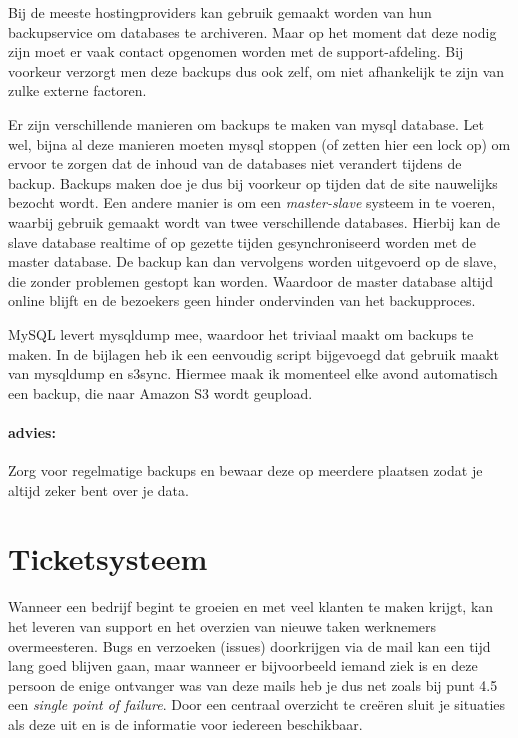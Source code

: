 Bij de meeste hostingproviders kan gebruik gemaakt worden van hun backupservice om databases te archiveren. Maar op het moment dat deze nodig zijn moet er vaak contact opgenomen worden met de support-afdeling. Bij voorkeur verzorgt men deze backups dus ook zelf, om niet afhankelijk te zijn van zulke externe factoren.

Er zijn verschillende manieren om backups te maken van {\sc mysql} database. Let wel, bijna al deze manieren moeten {\sc mysql} stoppen (of zetten hier een lock op) om ervoor te zorgen dat de inhoud van de databases niet verandert tijdens de backup. Backups maken doe je dus bij voorkeur op tijden dat de site nauwelijks bezocht wordt. Een andere manier is om een \emph{master-slave} systeem in te voeren, waarbij gebruik gemaakt wordt van twee verschillende databases. Hierbij kan de slave database realtime of op gezette tijden gesynchroniseerd worden met de master database. De backup kan dan vervolgens worden uitgevoerd op de slave, die zonder problemen gestopt kan worden. Waardoor de master database altijd online blijft en de bezoekers geen hinder ondervinden van het backupproces.

{\sc MySQL} levert mysqldump mee, waardoor het triviaal maakt om backups te maken. In de bijlagen heb ik een eenvoudig script bijgevoegd dat gebruik maakt van mysqldump en s3sync. Hiermee maak ik momenteel elke avond automatisch een backup, die naar Amazon S3 wordt geupload.

\paragraph{advies:} Zorg voor regelmatige backups en bewaar deze op meerdere plaatsen zodat je altijd zeker bent over je data.

\section{Ticketsysteem}

Wanneer een bedrijf begint te groeien en met veel klanten te maken krijgt, kan het leveren van support en het overzien van nieuwe taken werknemers overmeesteren. Bugs en verzoeken (issues) doorkrijgen via de mail kan een tijd lang goed blijven gaan, maar wanneer er bijvoorbeeld iemand ziek is en deze persoon de enige ontvanger was van deze mails heb je dus net zoals bij punt 4.5 een \emph{single point of failure}. Door een centraal overzicht te creëren sluit je situaties als deze uit en is de informatie voor iedereen beschikbaar.

